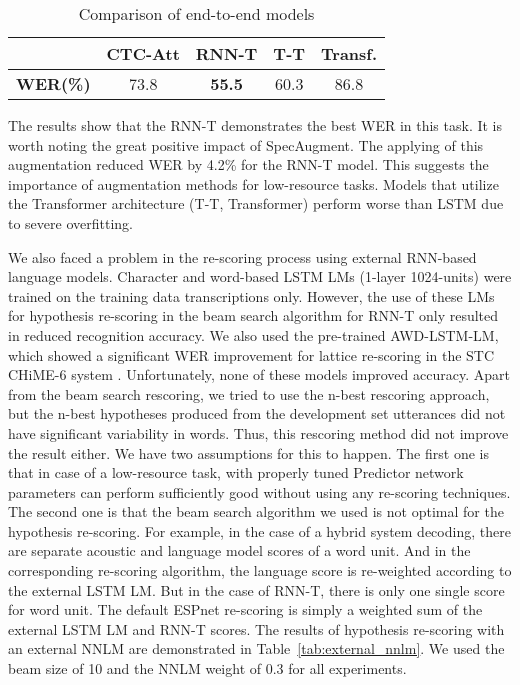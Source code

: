 \documentclass[a4paper]{article}
\begin{document}
\begin{table}[ht]
  \caption{Comparison of end-to-end models}
  \label{tab:models}
  \centering
  \begin{tabular}{c c c c c}
    \toprule
    \ & \textbf{CTC-Att} & \textbf{RNN-T} & \textbf{T-T} & \textbf{Transf.}  \\
    \midrule
    \textbf{WER(\%)} & 73.8 & \textbf{55.5} & 60.3 & 86.8 \\
    \bottomrule
  \end{tabular}
\end{table}

The results show that the RNN-T demonstrates the best WER in this task. It is worth noting the great positive impact of SpecAugment. The applying of this augmentation reduced WER by 4.2\% for the RNN-T model. This suggests the importance of augmentation methods for low-resource tasks. Models that utilize the Transformer architecture (T-T, Transformer) perform worse than LSTM due to severe overfitting.

We also faced a problem in the re-scoring process using external RNN-based language models. Character and word-based LSTM LMs (1-layer 1024-units) were trained on the training data transcriptions only. However, the use of these LMs for hypothesis re-scoring in the beam search algorithm for RNN-T only resulted in reduced recognition accuracy. We also used the pre-trained AWD-LSTM-LM, which showed a significant WER improvement for lattice re-scoring in the STC CHiME-6 system \cite{Medennikov_chime6}. Unfortunately, none of these models improved accuracy. Apart from the beam search rescoring, we tried to use the n-best rescoring approach, but the n-best hypotheses produced from the development set utterances did not have significant variability in words. Thus, this rescoring method did not improve the result either. We have two assumptions for this to happen. The first one is that in case of a low-resource task, with properly tuned Predictor network parameters can perform sufficiently good without using any re-scoring techniques. The second one is that the beam search algorithm we used is not optimal for the hypothesis re-scoring. For example, in the case of a hybrid system decoding, there are separate acoustic and language model scores of a word unit. And in the corresponding re-scoring algorithm, the language score is re-weighted according to the external LSTM LM. But in the case of RNN-T, there is only one single score for word unit. The default ESPnet re-scoring is simply a weighted sum of the external LSTM LM and RNN-T scores. The results of hypothesis re-scoring with an external NNLM are demonstrated in Table~\ref{tab:external_nnlm}. We used the beam size of 10 and the NNLM weight of 0.3 for all experiments.
\end{document}
